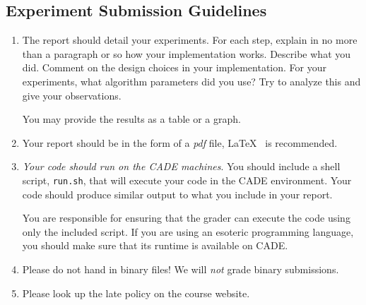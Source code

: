 
\subsection*{Experiment Submission Guidelines}
\begin{enumerate}
\item The report should detail your experiments. For each step,
  explain in no more than a paragraph or so how your implementation
  works. Describe what you did. Comment on the design choices in your
  implementation. For your experiments, what algorithm parameters did
  you use? Try to analyze this and give your observations. 

  You may provide the results as a table or a graph.

\item Your report should be in the form of a \emph{pdf} file, \LaTeX~
  is recommended.

\item {\em Your code should run on the CADE machines}. You should
  include a shell script, {\tt run.sh}, that will execute your code
  in the CADE environment. Your code should produce similar output
  to what you include in your report.
  
  You are responsible for ensuring that the grader can execute the
  code using only the included script. If you are using an
  esoteric programming language, you should make sure that its
  runtime is available on CADE.

\item Please do not hand in binary files! We will {\em not} grade
  binary submissions.

\item Please look up the late policy on the course website.

\end{enumerate}

